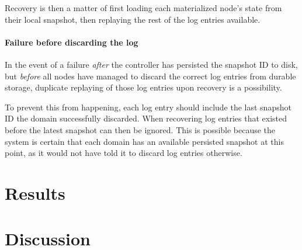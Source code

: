 \documentclass[b5paper]{report}
\begin{document}
Recovery is then a matter of first loading each materialized node's state from
their local snapshot, then replaying the rest of the log entries available.

\subsubsection{Failure before discarding the log}
In the event of a failure \textit{after} the controller has persisted the
snapshot ID to disk, but \textit{before} all nodes have managed to discard the
correct log entries from durable storage, duplicate replaying of those log
entries upon recovery is a possibility.

To prevent this from happening, each log
entry should include the last snapshot ID the domain successfully discarded.
When recovering log entries that existed before the latest snapshot can then be
ignored. This is possible because the system is certain that each domain has an
available persisted snapshot at this point, as it would not have told it to
discard log entries otherwise.

\chapter{Results}
\chapter{Discussion}



\end{document}
